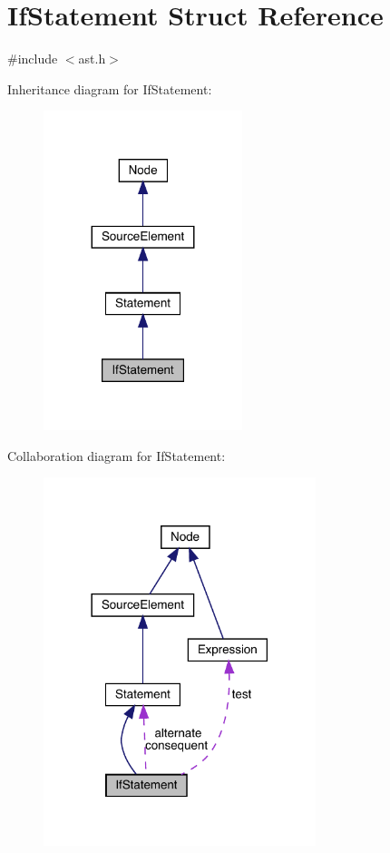 \hypertarget{struct_if_statement}{}\section{If\+Statement Struct Reference}
\label{struct_if_statement}


{\ttfamily \#include $<$ast.\+h$>$}



Inheritance diagram for If\+Statement\+:
\nopagebreak
\begin{figure}[H]
\begin{center}
\leavevmode
\includegraphics[width=164pt]{struct_if_statement__inherit__graph}
\end{center}
\end{figure}


Collaboration diagram for If\+Statement\+:
\nopagebreak
\begin{figure}[H]
\begin{center}
\leavevmode
\includegraphics[width=225pt]{struct_if_statement__coll__graph}
\end{center}
\end{figure}

